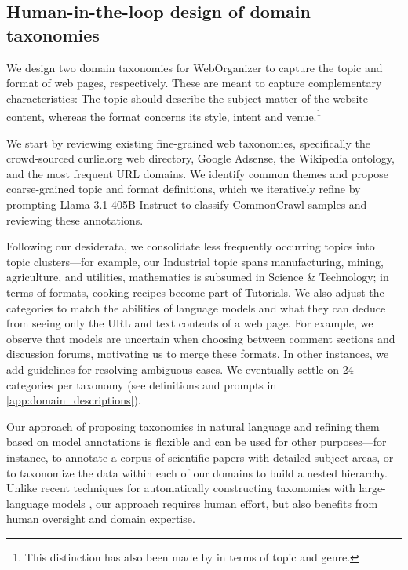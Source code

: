 \subsection{Human-in-the-loop design of domain taxonomies}

We design two domain taxonomies for WebOrganizer to capture the {\topics topic} and {\formats format} of web pages, respectively.
These are meant to capture complementary characteristics: The topic should describe the subject matter of the website content, whereas the format concerns its style, intent and venue.\footnote{
This distinction has also been made by \citet{vanderwees2015whats} in terms of topic and genre.}

We start by reviewing existing fine-grained web taxonomies, specifically the crowd-sourced {curlie.org} web directory, Google Adsense, the Wikipedia ontology, and the most frequent URL domains.
We identify common themes and propose coarse-grained topic and format definitions,
which we iteratively refine by prompting \mbox{Llama-3.1-405B-Instruct} \citep{dubey2024llama} to classify CommonCrawl samples and reviewing these annotations.

Following our desiderata, we consolidate less frequently occurring topics into topic clusters---for example, our {\atopic Industrial} topic spans manufacturing, mining, agriculture, and utilities, mathematics is subsumed in {\atopic Science \& Technology};
in terms of formats, cooking recipes become part of {\aformat Tutorials}.
We also adjust the categories to match the abilities of language models and what they can deduce from seeing only the URL and text contents of a web page.
For example, we observe that models are uncertain when choosing between comment sections and discussion forums, motivating us to merge these formats. 
In other instances, we add guidelines for resolving ambiguous cases.
We eventually settle on 24 categories per taxonomy (see definitions and prompts in  \autoref{app:domain_descriptions}).
 
Our approach of proposing taxonomies in natural language and refining them based on model annotations is flexible and can be used for other purposes---for instance, to annotate a corpus of scientific papers with detailed subject areas, or to taxonomize the data within each of our domains to build a nested hierarchy.
Unlike recent techniques for automatically constructing taxonomies with large-language models \citep{chen2021constructing, mishra2024flame, pham2024topicgpt}, our approach requires human effort, but also benefits from human oversight and domain expertise.


